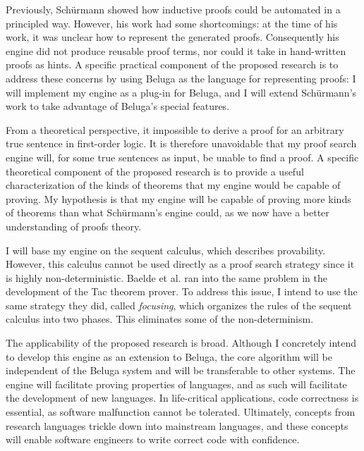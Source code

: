 \documentclass[12pt,letterpaper]{article}
\begin{document}
Previously, Schürmann\cite{schurmann-phd} showed how inductive proofs
could be automated in a principled way.
However, his work had some shortcomings: at the time of his work, it was
unclear how to represent the generated proofs.
Consequently his engine did not produce reusable proof terms, nor could it take
in hand-written proofs as hints.
A specific practical component of the proposed research is to address
these concerns by using Beluga as the language for representing proofs: I will
implement my engine as a plug-in for Beluga, and I will extend Schürmann's
work to take advantage of Beluga's special features.

From a theoretical perspective, it impossible to derive a proof for an
arbitrary true sentence in first-order logic.
It is therefore unavoidable that my proof search engine will, for some true
sentences as input, be unable to find a proof.
A specific theoretical component of the proposed research is to provide a
useful characterization of the kinds of theorems that my engine would be
capable of proving.
My hypothesis is that my engine will be capable of proving more kinds of
theorems than what Schürmann's engine could, as we now have a better
understanding of proofs theory.

I will base my engine on the sequent calculus, which describes provability.
However, this calculus cannot be used directly as a proof search strategy since
it is highly non-deterministic.
Baelde et al. ran into the same problem in the development of the Tac theorem
prover\cite{tac}. To address this issue, I intend to use the same strategy they
did, called \emph{focusing}, which organizes the rules of the sequent calculus
into two phases. This eliminates some of the non-determinism.

The applicability of the proposed research is broad.
Although I concretely intend to develop this engine as an extension to Beluga,
the core algorithm will be independent of the Beluga system and will be
transferable to other systems.
The engine will facilitate proving properties of languages, and as such
will facilitate the development of new languages.
In life-critical applications, code correctness is essential, as software
malfunction cannot be tolerated.
Ultimately, concepts from research languages trickle down into mainstream
languages, and these concepts will enable software engineers to write correct
code with confidence.

\pagebreak
\printbibliography
\end{document}
